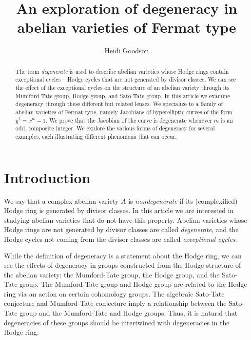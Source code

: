 \documentclass[reqno, oneside, 12pt]{amsart}
\author{Heidi Goodson}
\title{An exploration of degeneracy in abelian varieties of Fermat type}
\theoremstyle{remark}
\numberwithin{equation}{section}
\begin{document}
\maketitle 


\begin{abstract}
    The term \emph{degenerate} is used to describe abelian varieties whose Hodge rings contain exceptional cycles -- Hodge cycles that are not generated by divisor classes. We can see the effect of the exceptional cycles on the structure of an abelian variety through its Mumford-Tate group, Hodge group, and Sato-Tate group. In this article we examine degeneracy through these different but related lenses. We  specialize to a family of abelian varieties of Fermat type, namely Jacobians of hyperelliptic curves of the form $y^2=x^m-1$. We prove that the Jacobian of the curve is degenerate whenever $m$ is an odd, composite integer. We explore the various forms of degeneracy for several examples, each illustrating different phenomena that can occur.
\end{abstract}



\section{Introduction}

We say that a complex abelian variety $A$ is \emph{nondegenerate} if its (complexified) Hodge ring is generated by divisor classes. In this article we are interested in studying abelian varieties that do not have this property. Abelian varieties whose Hodge rings are not generated by divisor classes are called \emph{degenerate}, and the Hodge cycles not coming from the divisor classes are called \emph{exceptional cycles}. 

While the definition of degeneracy is a statement about the Hodge ring, we can see the effects of degeneracy in  groups constructed from the Hodge structure of the abelian variety: the Mumford-Tate group, the Hodge group, and the Sato-Tate group. The Mumford-Tate group and Hodge group are related to the Hodge ring via an action on certain cohomology groups. The algebraic Sato-Tate conjecture and Mumford-Tate conjecture imply a relationship between the Sato-Tate group and the Mumford-Tate and Hodge groups. Thus, it is natural that  degeneracies of these groups should be intertwined with degeneracies in the Hodge ring.
\end{document}

